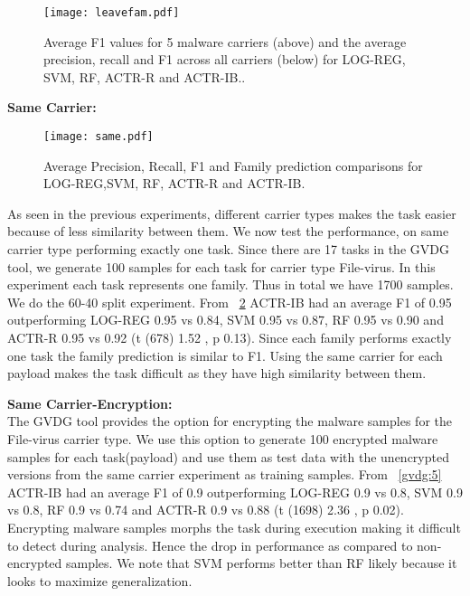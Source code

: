\documentclass[conference]{IEEEtran}
\begin{document}
\begin{figure}[htb!]
	\centerline{\texttt{[image: leavefam.pdf]}}
	\vspace{0em}
	\caption{\textmd{Average F1 values for 5 malware carriers (above) and the average precision, recall and F1 across all carriers (below) for LOG-REG, SVM, RF, ACTR-R and ACTR-IB..}}

	\label{gvdg:3}
\end{figure}

\noindent
{\bf Same Carrier:}\\
\vspace{-1em}
\begin{figure}[htb!]
	\centerline{\texttt{[image: same.pdf]}}
	\vspace{0em}
	\caption{\textmd{Average Precision, Recall, F1 and Family prediction comparisons for LOG-REG,SVM, RF, ACTR-R and ACTR-IB.}}
	\vspace{-2em}
	\label{gvdg:4}
\end{figure}

As seen in the previous experiments, different carrier types makes the task easier because of less similarity between them. We now test the performance, on same carrier type performing exactly one task. Since there are 17 tasks in the GVDG tool, we generate 100 samples for each task for carrier type File-virus. In this experiment each task represents one family. Thus in total we have 1700 samples. We do the 60-40 split experiment. From \figurename~\ref{gvdg:4}  ACTR-IB had an average F1 of 0.95 outperforming LOG-REG 0.95 vs 0.84, SVM 0.95 vs 0.87, RF 0.95 vs 0.90 and ACTR-R 0.95 vs 0.92 (t (678)  1.52 , p  0.13). Since each family performs exactly one task the family prediction is similar to F1. Using the same carrier for each payload makes the task difficult as they have high similarity between them. 

\noindent
{\bf Same Carrier-Encryption:}\\	
The GVDG tool provides the option for encrypting the malware samples for the File-virus carrier type. We use this option to generate 100 encrypted malware samples for each task(payload) and use them as test data with the unencrypted versions from the same carrier experiment as training samples. From \figurename~\ref{gvdg:5} ACTR-IB had an average F1 of 0.9 outperforming LOG-REG 0.9 vs 0.8, SVM 0.9 vs 0.8, RF 0.9 vs 0.74 and ACTR-R 0.9 vs 0.88 (t (1698)  2.36  , p  0.02). Encrypting malware samples morphs the task during execution making it difficult to detect during analysis. Hence the drop in performance as compared to non-encrypted samples. We note that SVM performs better than RF  likely because it looks to maximize generalization.\\
\end{document}
